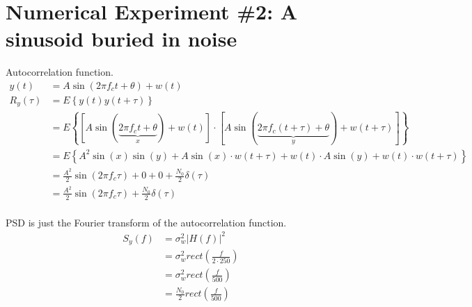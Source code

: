 \documentclass[12pt]{article}
\begin{document}

\section*{Numerical Experiment \#2: A sinusoid buried in noise}

Autocorrelation function.
\begin{equation*}
\begin{aligned}
        y(t) &= A\sin(2\pi f_ct + \theta) + w(t) \\
	R_y(\tau) &= E\left\{y(t)y(t+\tau)\right\} \\
        &= E\left \{\left[ A\sin(\underbrace{2 \pi f_c t + \theta}_{x}) + w(t) \right]\cdot \left[ A\sin(\underbrace{2 \pi f_c (t+\tau) + \theta}_{y}) + w(t+\tau) \right] \right \} \\
        &= E\left \{A^2\sin(x)\sin(y) + A\sin(x)\cdot w(t+\tau) + w(t)\cdot A\sin(y) + w(t)\cdot w(t+\tau)\right \} \\
        &= \frac{A^2}{2}\sin(2\pi f_c \tau) + 0 + 0 + \frac{N_0}{2}\delta(\tau) \\
        &= \frac{A^2}{2} \sin(2\pi f_c \tau) + \frac{N_0}{2}\delta(\tau) \\
\end{aligned}
\end{equation*}

PSD is just the Fourier transform of the autocorrelation function.
\begin{equation*}
\begin{aligned}
        S_y(f) &= \sigma_w^2 \left | H(f) \right |^2 \\
        &= \sigma_w^2 rect(\frac{f}{2\cdot 250}) \\
        &= \sigma_w^2 rect(\frac{f}{500}) \\
        &= \frac{N_0}{2} rect(\frac{f}{500}) \\
\end{aligned}
\end{equation*}

\end{document}
